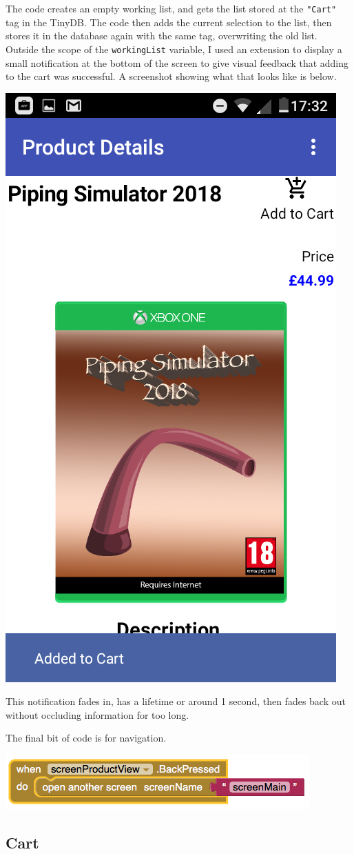 \documentclass{scrreprt}
\begin{document}
The code creates an empty working list, and gets the list stored at the \texttt{"Cart"} tag in the TinyDB. The code then adds the current selection to the list, then stores it in the database again with the same tag, overwriting the old list. Outside the scope of the \texttt{workingList} variable, I used an extension to display a small notification at the bottom of the screen to give visual feedback that adding to the cart was successful. A screenshot showing what that looks like is below.

\begin{center}
    \includegraphics[width=0.5\linewidth]{images/productSnackbar.png}
\end{center}

This notification fades in, has a lifetime or around 1 second, then fades back out without occluding information for too long.

The final bit of code is for navigation.

\begin{center}
    \includegraphics[width=0.75\linewidth]{images/productNav.png}
\end{center}

\subsection{Cart}
\end{document}
